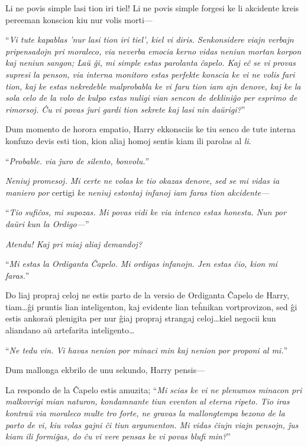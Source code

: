 Li ne povis simple lasi tion iri tiel! Li ne povis simple forgesi ke
li akcidente kreis pereeman konscion kiu nur volis morti—

``\emph{Vi tute kapablas 'nur lasi tion iri tiel', kiel vi
  diris. Senkonsidere viajn verbajn pripensadojn pri moraleco, via
  neverba emocia kerno vidas neniun mortan korpon kaj neniun sangon;
  Laŭ ĝi, mi simple estas parolanta ĉapelo. Kaj eĉ se vi provas
  supresi la penson, via interna monitoro estas perfekte konscia ke vi
  ne volis fari tion, kaj ke estas nekredeble malprobabla ke vi faru
  tion iam ajn denove, kaj ke la sola celo de la volo de kulpo estas
  nuligi vian sencon de dekliniĝo per esprimo de rimorsoj. Ĉu vi povas
  ĵuri gardi tion sekrete kaj lasi nin daŭrigi?}''


Dum momento de horora empatio, Harry ekkonsciis ke tiu senco de tute
interna konfuzo devis esti tion, kion aliaj homoj sentis kiam ili
parolas al \emph{li}.

``\emph{Probable. via ĵuro de silento, bonvolu.}''

\emph{Neniuj promesoj. Mi certe ne volas ke tio okazas denove, sed se
mi vidas ia maniero por} certigi \emph{ke neniuj estontaj infanoj iam
faras tion akcidente—}

``\emph{Tio sufiĉos, mi supozas. Mi povas vidi ke via intenco estas
honesta. Nun por daŭri kun la Ordigo—}''

\emph{Atendu! Kaj pri miaj aliaj demandoj?}

``\emph{Mi estas la Ordiganta Ĉapelo. Mi ordigas infanojn. Jen estas
  ĉio, kion mi faras.}''

Do liaj propraj celoj ne estis parto de la versio de Ordiganta Ĉapelo
de Harry, tiam\ldots ĝi pruntis lian inteligenton, kaj evidente lian
teĥnikan vortprovizon, sed ĝi estis ankoraŭ plenigita per nur ĝiaj
propraj strangaj celoj\ldots kiel negocii kun aliandano aŭ artefarita
inteligento\ldots

``\emph{Ne tedu vin. Vi havas nenion por minaci min kaj nenion por
  proponi al mi.}''

Dum mallonga ekbrilo de unu sekundo, Harry pensis—

La respondo de la Ĉapelo estis amuzita; ``\emph{Mi scias ke vi ne
  plenumos minacon pri malkovrigi mian naturon, kondamnante tiun
  eventon al eterna ripeto. Tio iras kontraŭ via moraleco multe tro
  forte, ne gravas la mallongtempa bezono de la parto de vi, kiu volas
  gajni ĉi tiun argumenton. Mi vidas ĉiujn viajn pensojn, ĵus kiam ili
  formiĝas, do ĉu vi vere pensas ke vi povas blufi min?}''

